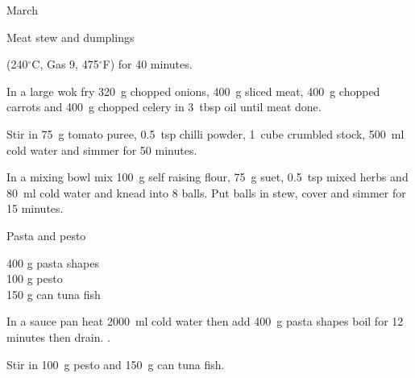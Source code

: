 \begin{menu}{March}
\begin{recipe}{2}{Meat stew and dumplings}
\begin{instructions}
      (240$^{\circ}$C, Gas 9, 475$^{\circ}$F)
     for 40 minutes.
    \item 
        In a large wok fry
        320~g chopped onions,
        400~g sliced meat,
        400~g chopped carrots
        and
        400~g chopped celery
        in
        3~tbsp  oil
        until meat done.
      \item 
        Stir in
        75~g  tomato puree,
        0.5~tsp  chilli powder,
        1~cube crumbled stock,
        500~ml  cold water
        and simmer for 50 minutes.
      \item 
        In a mixing bowl mix
        100~g  self raising flour,
        75~g  suet,
        0.5~tsp  mixed herbs
        and
        80~ml  cold water
        and knead into 8 balls.
        Put balls in stew, cover and
        simmer for 15 minutes.
      
    \end{instructions}
    \end{recipe}%
  
    \begin{recipe}{1}{Pasta and pesto}%
    
		\begin{ingredients}
		400 g pasta shapes  \\
	100 g pesto  \\
	150 g can tuna fish  \\
	
		\end{ingredients}
	
    \begin{instructions}
    \item 
      In a sauce pan heat
      2000~ml  cold water then add
      400~g  pasta shapes
      boil for 12
      minutes then drain.
    .
      \item 
        Stir in
        100~g  pesto and
        150~g  can tuna fish.
      
    \end{instructions}
    \end{recipe}%
  
    \clearpage
    \end{menu}
	
